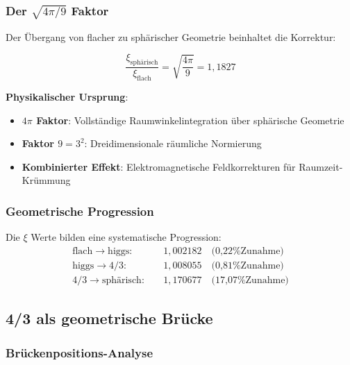 	\subsubsection{Der $\sqrt{4\pi/9}$ Faktor}
	\label{subsubsec:korrekturfaktor}
	
	Der Übergang von flacher zu sphärischer Geometrie beinhaltet die Korrektur:
	
	\begin{equation}
		\frac{\xi_{\text{sphärisch}}}{\xi_{\text{flach}}} = \sqrt{\frac{4\pi}{9}} = 1{,}1827
		\label{eq:em_korrektur}
	\end{equation}
	
	\textbf{Physikalischer Ursprung}:
	\begin{itemize}
		\item \textbf{$4\pi$ Faktor}: Vollständige Raumwinkelintegration über sphärische Geometrie
		\item \textbf{Faktor $9 = 3^2$}: Dreidimensionale räumliche Normierung
		\item \textbf{Kombinierter Effekt}: Elektromagnetische Feldkorrekturen für Raumzeit-Krümmung
	\end{itemize}
	
	\subsubsection{Geometrische Progression}
	\label{subsubsec:geometrische_progression}
	
	Die $\xi$ Werte bilden eine systematische Progression:
	\begin{align}
		\text{flach} \rightarrow \text{higgs}: \quad &1{,}002182 \quad \text{(0{,}22\% Zunahme)} \\
		\text{higgs} \rightarrow \text{4/3}: \quad &1{,}008055 \quad \text{(0{,}81\% Zunahme)} \\
		\text{4/3} \rightarrow \text{sphärisch}: \quad &1{,}170677 \quad \text{(17{,}07\% Zunahme)}
	\end{align}
	
	\subsection{4/3 als geometrische Brücke}
	\label{subsec:vier_drittel_bruecke}
	
	\subsubsection{Brückenpositions-Analyse}
	\label{subsubsec:brueckenposition}
	
